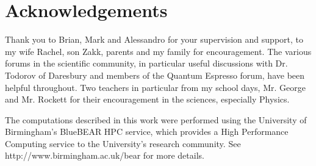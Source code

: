 \chapter{Acknowledgements}

Thank you to Brian, Mark and Alessandro for your supervision and support, to my wife Rachel, son Zakk, parents and my family for encouragement.  The various forums in the scientific community, in particular useful discussions with Dr. Todorov of Daresbury and members of the Quantum Espresso forum, have been helpful throughout.  Two teachers in particular from my school days, Mr. George and Mr. Rockett for their encouragement in the sciences, especially Physics.

The computations described in this work were performed using the University of Birmingham's BlueBEAR HPC service, which provides a High Performance Computing service to the University's research community. See http://www.birmingham.ac.uk/bear for more details.




